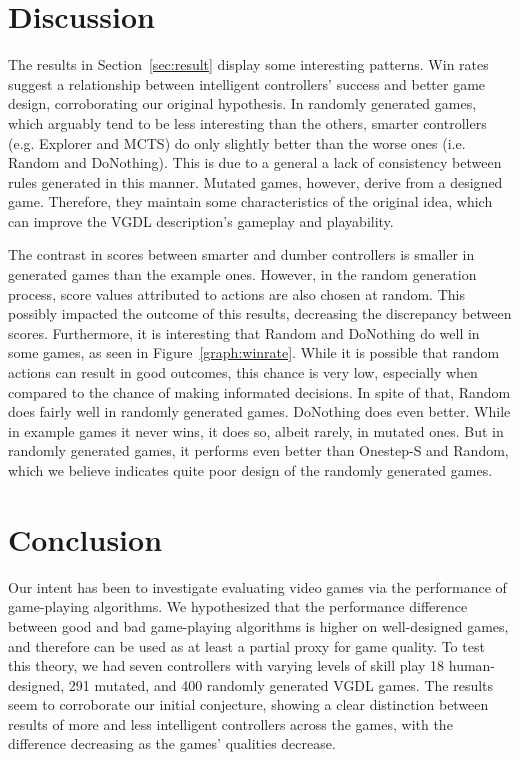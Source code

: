 \documentclass{llncs}
\begin{document}

\section{Discussion}

The results in Section~\ref{sec:result} display some interesting patterns. Win rates suggest a relationship between intelligent controllers' success and better game design, corroborating our original hypothesis. In randomly generated games, which arguably tend to be less interesting than the others, smarter controllers (e.g. Explorer and MCTS) do only slightly better than the worse ones (i.e. Random and DoNothing). This is due to a general a lack of consistency between rules generated in this manner. Mutated games, however, derive from a designed game. Therefore, they maintain some characteristics of the original idea, which can improve the VGDL description's gameplay and playability.

The contrast in scores between smarter and dumber controllers is smaller in generated games than the example ones. However, in the random generation process, score values attributed to actions are also chosen at random. This possibly impacted the outcome of this results, decreasing the discrepancy between scores.
Furthermore, it is interesting that Random and DoNothing do well in some games, as seen in Figure~\ref{graph:winrate}. While it is possible that random actions can result in good outcomes, this chance is very low, especially when compared to the chance of making informated decisions. In spite of that, Random does fairly well in randomly generated games. DoNothing does even better. While in example games it never wins, it does so, albeit rarely, in mutated ones. But in randomly generated games, it performs even better than Onestep-S and Random, which we believe indicates quite poor design of the randomly generated games.


\section{Conclusion}
Our intent has been to investigate evaluating video games via the performance of game-playing algorithms. We hypothesized that the performance difference between good and bad game-playing algorithms is higher on well-designed games, and therefore can be used as at least a partial proxy for game quality. To test this theory, we had seven controllers with varying levels of skill play 18 human-designed, 291 mutated, and 400 randomly generated VGDL games. The results seem to corroborate our initial conjecture, showing a clear distinction between results of more and less intelligent controllers across the games, with the difference decreasing as the games' qualities decrease.
\end{document}
